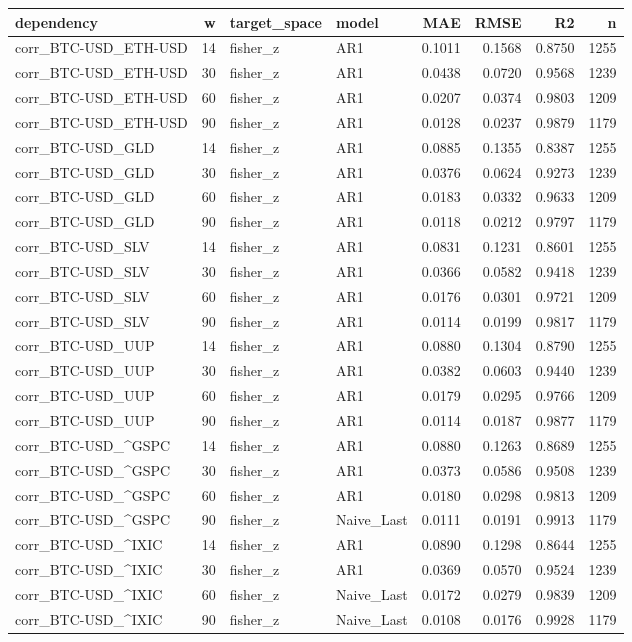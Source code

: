 \begin{tabular}{lrllrrrr}
\toprule
dependency & w & target\_space & model & MAE & RMSE & R2 & n \\
\midrule
corr\_BTC-USD\_ETH-USD & 14 & fisher\_z & AR1 & 0.1011 & 0.1568 & 0.8750 & 1255 \\
corr\_BTC-USD\_ETH-USD & 30 & fisher\_z & AR1 & 0.0438 & 0.0720 & 0.9568 & 1239 \\
corr\_BTC-USD\_ETH-USD & 60 & fisher\_z & AR1 & 0.0207 & 0.0374 & 0.9803 & 1209 \\
corr\_BTC-USD\_ETH-USD & 90 & fisher\_z & AR1 & 0.0128 & 0.0237 & 0.9879 & 1179 \\
corr\_BTC-USD\_GLD & 14 & fisher\_z & AR1 & 0.0885 & 0.1355 & 0.8387 & 1255 \\
corr\_BTC-USD\_GLD & 30 & fisher\_z & AR1 & 0.0376 & 0.0624 & 0.9273 & 1239 \\
corr\_BTC-USD\_GLD & 60 & fisher\_z & AR1 & 0.0183 & 0.0332 & 0.9633 & 1209 \\
corr\_BTC-USD\_GLD & 90 & fisher\_z & AR1 & 0.0118 & 0.0212 & 0.9797 & 1179 \\
corr\_BTC-USD\_SLV & 14 & fisher\_z & AR1 & 0.0831 & 0.1231 & 0.8601 & 1255 \\
corr\_BTC-USD\_SLV & 30 & fisher\_z & AR1 & 0.0366 & 0.0582 & 0.9418 & 1239 \\
corr\_BTC-USD\_SLV & 60 & fisher\_z & AR1 & 0.0176 & 0.0301 & 0.9721 & 1209 \\
corr\_BTC-USD\_SLV & 90 & fisher\_z & AR1 & 0.0114 & 0.0199 & 0.9817 & 1179 \\
corr\_BTC-USD\_UUP & 14 & fisher\_z & AR1 & 0.0880 & 0.1304 & 0.8790 & 1255 \\
corr\_BTC-USD\_UUP & 30 & fisher\_z & AR1 & 0.0382 & 0.0603 & 0.9440 & 1239 \\
corr\_BTC-USD\_UUP & 60 & fisher\_z & AR1 & 0.0179 & 0.0295 & 0.9766 & 1209 \\
corr\_BTC-USD\_UUP & 90 & fisher\_z & AR1 & 0.0114 & 0.0187 & 0.9877 & 1179 \\
corr\_BTC-USD\_\textasciicircum GSPC & 14 & fisher\_z & AR1 & 0.0880 & 0.1263 & 0.8689 & 1255 \\
corr\_BTC-USD\_\textasciicircum GSPC & 30 & fisher\_z & AR1 & 0.0373 & 0.0586 & 0.9508 & 1239 \\
corr\_BTC-USD\_\textasciicircum GSPC & 60 & fisher\_z & AR1 & 0.0180 & 0.0298 & 0.9813 & 1209 \\
corr\_BTC-USD\_\textasciicircum GSPC & 90 & fisher\_z & Naive\_Last & 0.0111 & 0.0191 & 0.9913 & 1179 \\
corr\_BTC-USD\_\textasciicircum IXIC & 14 & fisher\_z & AR1 & 0.0890 & 0.1298 & 0.8644 & 1255 \\
corr\_BTC-USD\_\textasciicircum IXIC & 30 & fisher\_z & AR1 & 0.0369 & 0.0570 & 0.9524 & 1239 \\
corr\_BTC-USD\_\textasciicircum IXIC & 60 & fisher\_z & Naive\_Last & 0.0172 & 0.0279 & 0.9839 & 1209 \\
corr\_BTC-USD\_\textasciicircum IXIC & 90 & fisher\_z & Naive\_Last & 0.0108 & 0.0176 & 0.9928 & 1179 \\
\bottomrule
\end{tabular}
